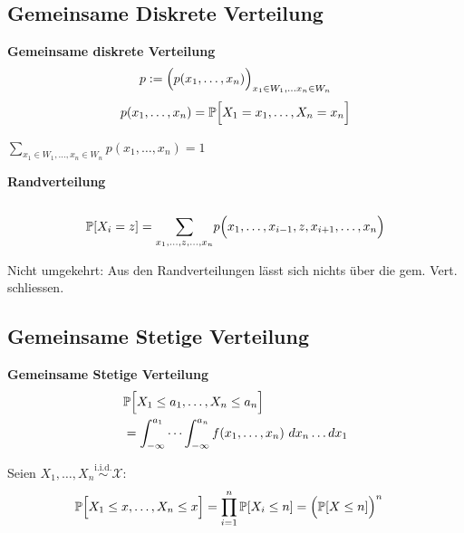 \subsection{Gemeinsame Diskrete Verteilung}

 \textbf{Gemeinsame diskrete Verteilung}\\
$$
    p := \Bigl(p(x_1,\ldots,x_n)\Bigr)_{x_1\in W_1,\ldots x_n\in W_n} 
$$
$$
    p(x_1,\ldots,x_n) = \P\Bigl[ X_1=x_1,\ldots,X_n=x_n \Bigr]
$$

\theorem $\displaystyle\sum_{x_1\in W_1,\ldots,x_n\in W_n} p(x_1,\ldots,x_n) = 1$

\theorem \textbf{Randverteilung}\\
\\
\begin{align*}
 \P[X_i = z] = \underset{x_1,\ldots,z,\ldots,x_n}{\sum} p\Bigl( x_1,\ldots,x_{i-1},z,x_{i+1},\ldots,x_n \Bigr)
\end{align*}

{\footnotesize
    \remark Nicht umgekehrt: Aus den Randverteilungen lässt sich nichts über die gem. Vert. schliessen.
}
\subsection{Gemeinsame Stetige Verteilung}

 \textbf{Gemeinsame Stetige Verteilung}\\
\begin{align*}
        &\P\Bigl[ X_1\leq a_1,\ldots,X_n\leq a_n \Bigr] \\
        &= \int_{-\infty}^{a_1}\cdots\int_{-\infty}^{a_n} f(x_1,\ldots,x_n)\ dx_n\ldots dx_1    
\end{align*}


{\footnotesize
    \remark Seien $X_1,\ldots,X_n \overset{\text{i.i.d.}}{\sim} \mathcal{X}$:
    \begin{align*}
        &\P\Bigl[ X_1 \leq x,\ldots, X_n \leq x \Bigr] = \prod_{i=1}^n \P[X_i \leq n] = \Bigl( \P[X \leq n] \Bigr)^n
    \end{align*}
}

